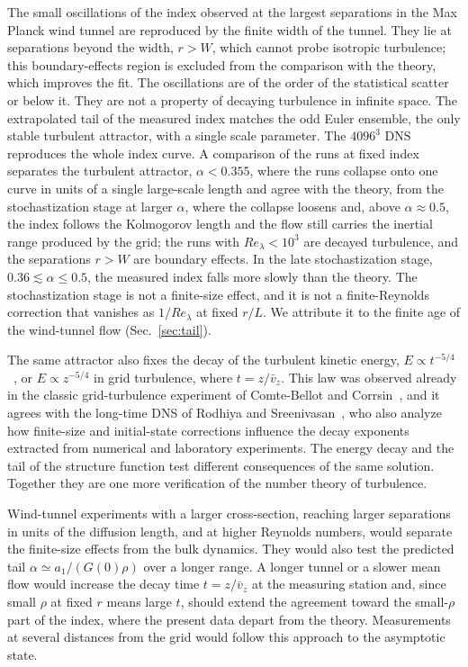 \documentclass[floatfix,aps,pre,preprint,superscriptaddress,nofootinbib,amsmath,amssymb]{revtex4-2}
\begin{document}
The small oscillations of the index observed at the largest separations in the Max Planck wind tunnel are reproduced by the
finite width of the tunnel. They lie at separations beyond the width, $r>W$, which cannot probe isotropic turbulence; this
boundary-effects region is excluded from the comparison with the theory, which improves the fit. The oscillations are of the
order of the statistical scatter or below it. They are not a property of decaying turbulence in infinite space. The extrapolated tail of
the measured index matches the odd Euler ensemble, the only stable turbulent attractor, with a single scale parameter. The
$4096^3$ DNS reproduces the whole index curve. A comparison of the runs at fixed index separates the turbulent attractor,
$\alpha<0.355$, where the runs collapse onto one curve in units of a single large-scale length and agree with the theory, from
the stochastization stage at larger $\alpha$, where the collapse loosens and, above $\alpha\approx0.5$, the index follows the
Kolmogorov length and the flow still carries the inertial range produced by the grid; the runs with $Re_\lambda<10^3$ are
decayed turbulence, and the separations $r>W$ are boundary effects. In the late stochastization stage, $0.36\lesssim\alpha\le0.5$, the measured index falls more slowly than
the theory. The stochastization stage is not a
finite-size effect, and it is not a finite-Reynolds correction that vanishes as $1/Re_\lambda$ at fixed $r/L$. We attribute it to
the finite age of the wind-tunnel flow (Sec.~\ref{sec:tail}).

The same attractor also fixes the decay of the turbulent kinetic energy, $E\propto t^{-5/4}$~\cite{migdal2024quantum},
or $E\propto z^{-5/4}$ in grid turbulence, where $t=z/\bar v_z$. This law was observed already in the classic grid-turbulence
experiment of Comte-Bellot and Corrsin~\cite{GridTurbulence_1966}, and it agrees with the long-time DNS of Rodhiya and
Sreenivasan~\cite{SreeniAkash2025}, who also analyze how finite-size and initial-state corrections influence the decay
exponents extracted from numerical and laboratory experiments. The energy decay and the tail of the structure function test
different consequences of the same solution. Together they are one more verification of the number theory of turbulence.

Wind-tunnel experiments with a larger cross-section, reaching larger separations in units of the diffusion length, and at
higher Reynolds numbers, would separate the finite-size effects from the bulk dynamics. They would also test the predicted
tail $\alpha\simeq a_1/(G(0)\rho)$ over a longer range. A longer tunnel or a slower mean flow would increase the decay time
$t=z/\bar v_z$ at the measuring station and, since small $\rho$ at fixed $r$ means large $t$, should extend the agreement
toward the small-$\rho$ part of the index, where the present data depart from the theory. Measurements at several distances
from the grid would follow this approach to the asymptotic state.
\end{document}

